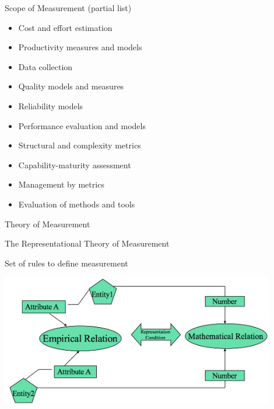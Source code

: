 \documentclass{beamer}
\begin{document}
\begin{frame}{\centerline{Scope of Measurement (partial list)}}
\begin{itemize}
    \item Cost and effort estimation
    \item Productivity measures and models
    \item Data collection
    \item Quality models and measures
    \item Reliability models
    \item Performance evaluation and models
    \item Structural and complexity metrics
    \item Capability-maturity assessment
    \item Management by metrics
    \item Evaluation of methods and tools
\end{itemize}
\end{frame}

\begin{frame}{\centerline{}}

\begin{center}
{\Large
Theory of Measurement
}
\end{center}

\end{frame}



\begin{frame}{\centerline{The Representational Theory of Measurement}}
Set of rules to define measurement

\begin{center}
\includegraphics[width=120mm]{A2022.IDSEPC.SperimentazioneDeduzione/img-img07.png}
\end{center}
\end{frame}
\end{document}
